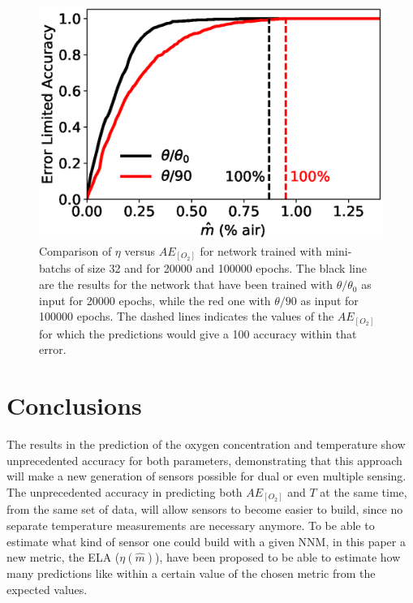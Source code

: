 \documentclass[9pt,twocolumn,twoside,pdftex]{optica}
\begin{document}
\begin{figure}[htbp]
\centering
\includegraphics[width=7 cm]{ELA_comparison.eps}
\caption{Comparison of $\eta$ versus $AE_{[O_2]}$ for network trained with mini-batchs of size 32 and for 20000 and 100000 epochs. The black line are the results for the network that have been trained with $\theta/\theta_0$ as input for 20000 epochs, while the red one with $\theta/90$ as input for 100000 epochs. The dashed lines indicates the values of the $AE_{[O_2]}$ for which the predictions would give a 100 accuracy within that error.}
\label{fig:ELA_result_comparison}
\end{figure}


%
%
%


%
%
%
%




\section{Conclusions}

The results in the prediction of the oxygen concentration and temperature show unprecedented accuracy for both parameters, demonstrating that this approach will make a new generation of sensors possible for dual or even multiple sensing. The unprecedented accuracy in predicting both $AE_{[O_2]}$ and $T$ at the same time, from the same set of data, will allow sensors to become easier to build, since no separate temperature measurements are necessary anymore. To be able to estimate what kind of sensor one could build with a given NNM, in this paper a new metric, the ELA ($\eta(\hat m)$), have been proposed to be able to estimate how many predictions like within a certain value of the chosen metric from the expected values.
\end{document}
